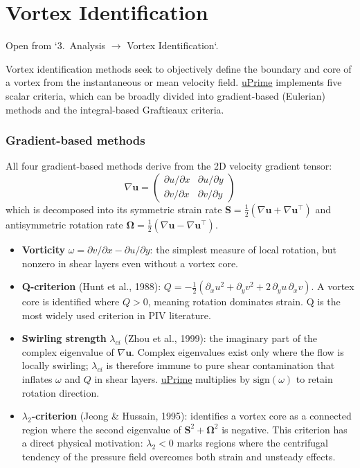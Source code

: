 \section{Vortex Identification}
\label{ch:vortex}

Open from `3.\ Analysis $\to$ Vortex Identification`.

Vortex identification methods seek to objectively define the boundary and core of a vortex from the instantaneous or mean velocity field. \href{https://cmdrryder.github.io/uPrime/}{uPrime} implements five scalar criteria, which can be broadly divided into gradient-based (Eulerian) methods and the integral-based Graftieaux criteria.

\subsubsection*{Gradient-based methods}

All four gradient-based methods derive from the 2D velocity gradient tensor:
\[
\nabla \mathbf{u} = \begin{pmatrix} \partial u/\partial x & \partial u/\partial y \\ \partial v/\partial x & \partial v/\partial y \end{pmatrix}
\]
which is decomposed into its symmetric strain rate $\mathbf{S} = \tfrac{1}{2}(\nabla\mathbf{u} + \nabla\mathbf{u}^\top)$ and antisymmetric rotation rate $\boldsymbol{\Omega} = \tfrac{1}{2}(\nabla\mathbf{u} - \nabla\mathbf{u}^\top)$.

\begin{itemize}[leftmargin=1.5em]
  \item \textbf{Vorticity} $\omega = \partial v/\partial x - \partial u/\partial y$: the simplest measure of local rotation, but nonzero in shear layers even without a vortex core.

  \item \textbf{Q-criterion} (Hunt et al., 1988): $Q = -\tfrac{1}{2}(\partial_x u^2 + \partial_y v^2 + 2\,\partial_y u\,\partial_x v)$. A vortex core is identified where $Q > 0$, meaning rotation dominates strain. Q is the most widely used criterion in PIV literature.

  \item \textbf{Swirling strength} $\lambda_{ci}$ (Zhou et al., 1999): the imaginary part of the complex eigenvalue of $\nabla\mathbf{u}$. Complex eigenvalues exist only where the flow is locally swirling; $\lambda_{ci}$ is therefore immune to pure shear contamination that inflates $\omega$ and $Q$ in shear layers. \href{https://cmdrryder.github.io/uPrime/}{uPrime} multiplies by $\text{sign}(\omega)$ to retain rotation direction.

  \item \textbf{$\lambda_2$-criterion} (Jeong \& Hussain, 1995): identifies a vortex core as a connected region where the second eigenvalue of $\mathbf{S}^2 + \boldsymbol{\Omega}^2$ is negative. This criterion has a direct physical motivation: $\lambda_2 < 0$ marks regions where the centrifugal tendency of the pressure field overcomes both strain and unsteady effects.
\end{itemize}

